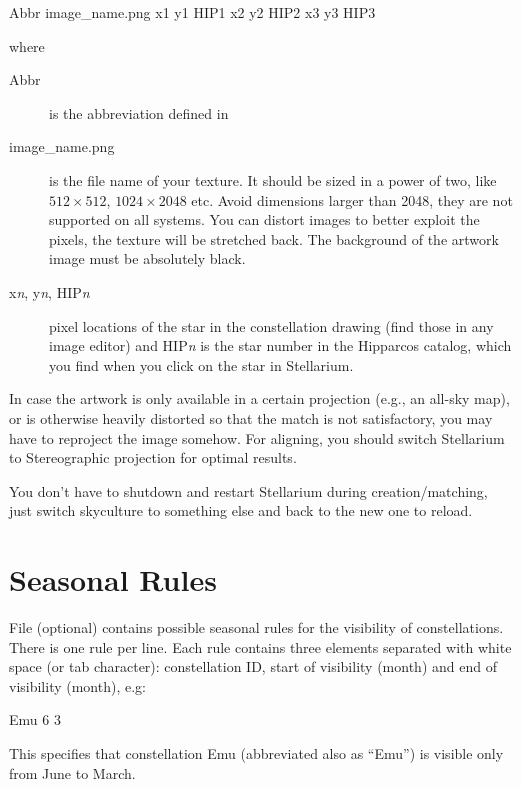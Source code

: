 \begin{configfile}
  Abbr image_name.png x1 y1 HIP1 x2 y2 HIP2 x3 y3 HIP3
\end{configfile}
where 
\begin{description}
\item[Abbr] is the abbreviation defined in 
\item[image\_name.png] is the file name of your texture. It should be
  sized in a power of two, like $512\times512$, $1024\times2048$
  etc. Avoid dimensions larger than 2048, they are not supported on
  all systems. You can distort images to better exploit the pixels,
  the texture will be stretched back. The background of the artwork
  image must be absolutely black.
\item[x\textit{n}, y\textit{n}, HIP\textit{n}] pixel locations of the
  star in the constellation drawing (find those in any image editor)
  and HIP\textit{n} is the star number in the Hipparcos catalog, which
  you find when you click on the star in Stellarium.
\end{description}

In case the artwork is only available in a certain projection (e.g.,
an all-sky map), or is otherwise heavily distorted so that the match
is not satisfactory, you may have to reproject the image somehow. For
aligning, you should switch Stellarium to Stereographic projection for
optimal results.

You don't have to shutdown and restart Stellarium during
creation/matching, just switch skyculture to something else and back
to the new one to reload.

\section{Seasonal Rules}
\label{sec:skycultures:seasonal_rules}

File  (optional) contains possible seasonal rules for
the visibility of constellations. There is one rule per line. Each
rule contains three elements separated with white space (or tab
character): constellation ID, start of visibility (month) and end of
visibility (month), e.g:

\begin{configfile}
  Emu 6 3
\end{configfile}

\noindent This specifies that constellation Emu (abbreviated also as ``Emu'') is
visible only from June to March.

